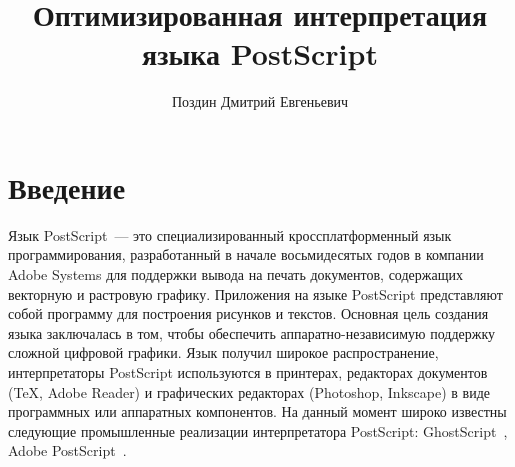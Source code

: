 





\title{Оптимизированная интерпретация языка PostScript}


\author{Поздин Дмитрий Евгеньевич}



\maketitle             
	

	\section*{Введение}

	Язык PostScript~--- это  специализированный кроссплатформенный язык программирования, разработанный в начале восьмидесятых годов в компании Adobe Systems для поддержки вывода на печать документов, содержащих векторную и растровую графику. Приложения на языке PostScript представляют собой программу для построения рисунков и текстов. Основная цель создания языка заключалась в том, чтобы обеспечить аппаратно-независимую поддержку сложной цифровой графики. Язык получил широкое распространение, интерпретаторы PostScript используются в принтерах, редакторах документов (\TeX, Adobe Reader) и графических редакторах (Photoshop, Inkscape) в виде программных или аппаратных компонентов. На данный момент широко известны следующие промышленные реализации интерпретатора PostScript: GhostScript~\cite{GS-site}, Adobe PostScript~\cite{Adobe-PS-site}. 
	
